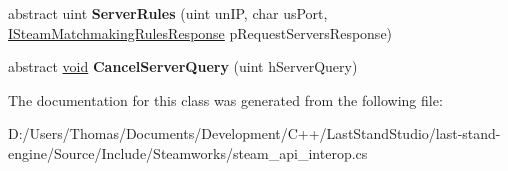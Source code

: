 \begin{DoxyCompactItemize}
\item 
\hypertarget{classValve_1_1Steamworks_1_1ISteamMatchmakingServers_a6739f8979eaca5ef7fc7f54ede52533a}{}abstract uint {\bfseries Server\+Rules} (uint un\+I\+P, char us\+Port, \hyperlink{classValve_1_1Steamworks_1_1ISteamMatchmakingRulesResponse}{I\+Steam\+Matchmaking\+Rules\+Response} p\+Request\+Servers\+Response)\label{classValve_1_1Steamworks_1_1ISteamMatchmakingServers_a6739f8979eaca5ef7fc7f54ede52533a}

\item 
\hypertarget{classValve_1_1Steamworks_1_1ISteamMatchmakingServers_aa5281f08b3c612b54f26fd9f3acabd7d}{}abstract \hyperlink{SDL__audio_8h_a52835ae37c4bb905b903cbaf5d04b05f}{void} {\bfseries Cancel\+Server\+Query} (uint h\+Server\+Query)\label{classValve_1_1Steamworks_1_1ISteamMatchmakingServers_aa5281f08b3c612b54f26fd9f3acabd7d}

\end{DoxyCompactItemize}


The documentation for this class was generated from the following file\+:\begin{DoxyCompactItemize}
\item 
D\+:/\+Users/\+Thomas/\+Documents/\+Development/\+C++/\+Last\+Stand\+Studio/last-\/stand-\/engine/\+Source/\+Include/\+Steamworks/steam\+\_\+api\+\_\+interop.\+cs\end{DoxyCompactItemize}
